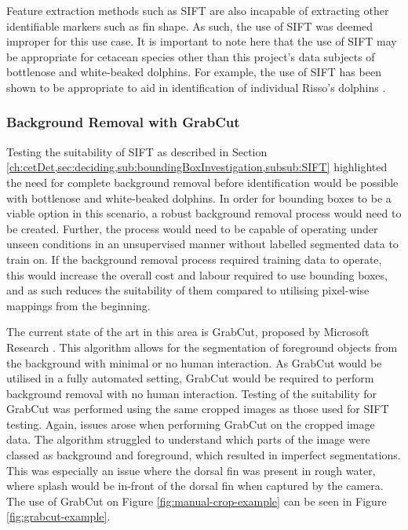 Feature extraction methods such as SIFT are also incapable of extracting other identifiable markers such as fin shape. As such, the use of SIFT was deemed improper for this use case. It is important to note here that the use of SIFT may be appropriate for cetacean species other than this project's data subjects of bottlenose and white-beaked dolphins. For example, the use of SIFT has been shown to be appropriate to aid in identification of individual Risso's dolphins \cite{reno_sift-based_2019}.

\subsubsection{Background Removal with GrabCut}\label{ch:cetDet,sec:deciding,sub:boundingBoxInvestigation,subsub:GrabCut}

Testing the suitability of SIFT as described in Section \ref{ch:cetDet,sec:deciding,sub:boundingBoxInvestigation,subsub:SIFT} highlighted the need for complete background removal before identification would be possible with bottlenose and white-beaked dolphins. In order for bounding boxes to be a viable option in this scenario, a robust background removal process would need to be created. Further, the process would need to be capable of operating under unseen conditions in an unsupervised manner without labelled segmented  data to train on. If the background removal process required training data to operate, this would increase the overall cost and labour required to use bounding boxes, and as such reduces the suitability of them compared to utilising pixel-wise mappings from the beginning. 

The current state of the art in this area is GrabCut, proposed by Microsoft Research \cite{rother_grabcut_2004}. This algorithm allows for the segmentation of foreground objects from the background with minimal or no human interaction. As GrabCut would be utilised in a fully automated setting, GrabCut would be required to perform background removal with no human interaction. Testing of the suitability for GrabCut was performed using the same cropped images as those used for SIFT testing. Again, issues arose when performing GrabCut on the cropped image data. The algorithm struggled to understand which parts of the image were classed as background and foreground, which resulted in imperfect segmentations. This was especially an issue where the dorsal fin was present in rough water, where splash would be in-front of the dorsal fin when captured by the camera. The use of GrabCut on Figure \ref{fig:manual-crop-example} can be seen in Figure \ref{fig:grabcut-example}.


